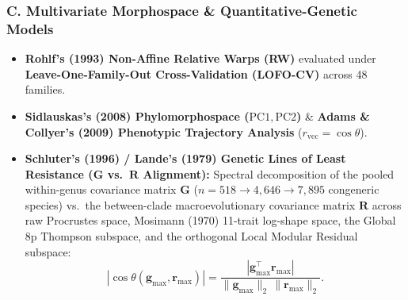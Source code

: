 \documentclass[10.5pt,a4paper]{article}
\begin{document}
\subsubsection*{C. Multivariate Morphospace \& Quantitative-Genetic Models}
\begin{itemize}
  \setlength{\itemsep}{3pt}
  \item \textbf{Rohlf's (1993) Non-Affine Relative Warps (RW)} evaluated under \textbf{Leave-One-Family-Out Cross-Validation (LOFO-CV)} across 48 families.
  \item \textbf{Sidlauskas's (2008) Phylomorphospace ($\mathrm{PC1}, \mathrm{PC2}$)} \& \textbf{Adams \& Collyer's (2009) Phenotypic Trajectory Analysis} ($r_{\mathrm{vec}} = \cos\theta$).
  \item \textbf{Schluter's (1996) / Lande's (1979) Genetic Lines of Least Resistance ($\bm{G}$ vs.\ $\bm{R}$ Alignment):} Spectral decomposition of the pooled within-genus covariance matrix $\bm{G}$ ($n = 518 \to 4{,}646 \to 7{,}895$ congeneric species) vs.\ the between-clade macroevolutionary covariance matrix $\bm{R}$ across raw Procrustes space, Mosimann (1970) 11-trait log-shape space, the Global 8p Thompson subspace, and the orthogonal Local Modular Residual subspace:
  \[
    |\cos\theta(\bm{g}_{\max}, \bm{r}_{\max})| = \frac{|\bm{g}_{\max}^\top \bm{r}_{\max}|}{\|\bm{g}_{\max}\|_2 \, \|\bm{r}_{\max}\|_2}.
  \]
\end{itemize}
\end{document}
